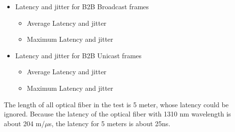 \begin{itemize}
    \item Latency and jitter for B2B Broadcast frames
		\begin{itemize}
    		\item Average Latency and jitter
			\item Maximum Latency and jitter
		\end{itemize}
    \item Latency and jitter for B2B Unicast frames
		\begin{itemize}
    		\item Average Latency and jitter
			\item Maximum Latency and jitter
		\end{itemize}
\end{itemize}

The length of all optical fiber in the test is 5 meter, whose latency could be ignored. Because the latency of the optical fiber with 1310 nm wavelength is about 204 m/$\mu$s, the latency for 5 meters is about 25ns.


